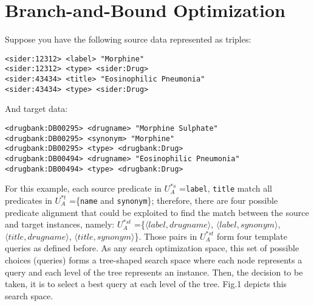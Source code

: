 \section{Branch-and-Bound Optimization}


Suppose you have the following source data represented as triples:
\begin{lstlisting}[basicstyle=\LSTfont]
<sider:12312> <label> "Morphine"
<sider:12312> <type> <sider:Drug>
<sider:43434> <title> "Eosinophilic Pneumonia"
<sider:43434> <type> <sider:Drug>
\end{lstlisting}
And target data: 
\begin{lstlisting}[basicstyle=\LSTfont]
<drugbank:DB00295> <drugname> "Morphine Sulphate"
<drugbank:DB00295> <synonym> "Morphine"
<drugbank:DB00295> <type> <drugbank:Drug>
<drugbank:DB00494> <drugname> "Eosinophilic Pneumonia"
<drugbank:DB00494> <type> <drugbank:Drug>
\end{lstlisting}

For this example, each source predicate in $U^{*s}_A$ ={\verb+label+, \verb+title+} match all predicates in $U^{*t}_A$ =\{\verb+name+ and \verb+synonym+\}; therefore, there are four possible predicate alignment that could be exploited to find the match between the source and target instances, namely: $U^{*st}_A$ =\{$\langle label,drugname \rangle$, $\langle label,synonym \rangle$,$\langle title,drugname \rangle$, $\langle title,synonym \rangle$\}. Those pairs in  $U^{*st}_A$ form four template queries as defined before. As any search optimization space, this set of possible choices (queries) forms a tree-shaped search space where each node represents a query and each level of the tree represents an instance. Then, the decision to be taken, it is to select a best query at each level of the tree. Fig.1 depicts this search space.

